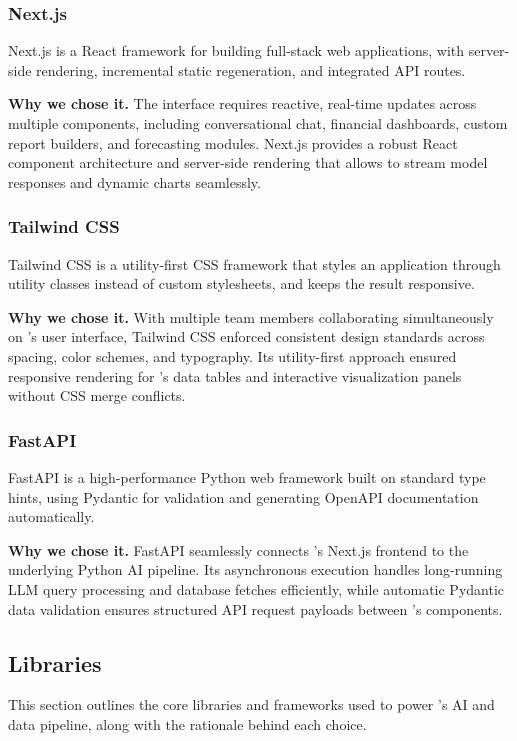 \subsubsection{Next.js}
Next.js is a React framework for building full-stack web applications,
with server-side rendering, incremental static regeneration, and
integrated API routes.

\noindent \textbf{Why we chose it.} The \projname{} interface requires reactive,
real-time updates across multiple components, including conversational chat,
financial dashboards, custom report builders, and forecasting modules.
Next.js provides a robust React component architecture and server-side
rendering that allows \projname{} to stream model responses and dynamic
charts seamlessly.

\subsubsection{Tailwind CSS}
Tailwind CSS is a utility-first CSS framework that styles an application
through utility classes instead of custom stylesheets, and keeps the
result responsive.

\noindent \textbf{Why we chose it.} With multiple team members collaborating
simultaneously on \projname{}'s user interface, Tailwind CSS enforced consistent
design standards across spacing, color schemes, and typography. Its
utility-first approach ensured responsive rendering for \projname{}'s data tables
and interactive visualization panels without CSS merge conflicts.

\subsubsection{FastAPI}
FastAPI is a high-performance Python web framework built on standard
type hints, using Pydantic for validation and generating OpenAPI
documentation automatically.

\noindent \textbf{Why we chose it.} FastAPI seamlessly connects \projname{}'s Next.js frontend
to the underlying Python AI pipeline. Its asynchronous execution handles
long-running LLM query processing and database fetches efficiently, while
automatic Pydantic data validation ensures structured API request payloads
between \projname{}'s components.

\subsection{Libraries}
\label{sub:libraries}
This section outlines the core libraries and frameworks used to power \projname{}'s AI and data pipeline, along with the rationale behind each choice.

